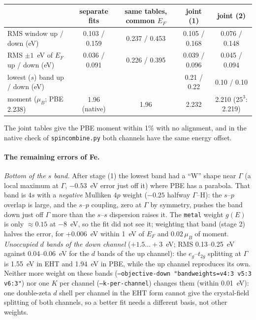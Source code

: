 \documentclass[11pt,a4paper]{article}
\newcommand{\cmd}[1]{\texttt{#1}}
\renewcommand{\_}{\origunderscore\allowbreak}
\begin{document}
\begin{center}\footnotesize\setlength{\tabcolsep}{4pt}
\begin{tabular}{l c c c c}
\toprule
 & separate fits & same tables, common $E_F$ & joint (1) & joint (2) \\
\midrule
RMS window up / down (eV) & 0.103 / 0.159 & 0.237 / 0.453 & 0.105 / 0.168 & 0.076 / 0.148 \\
RMS $\pm1$~eV of $E_F$ up / down (eV) & 0.036 / 0.091 & 0.226 / 0.395 & 0.039 / 0.096 & 0.045 / 0.094 \\
lowest ($s$) band up / down (eV) & & & 0.21 / 0.22 & 0.10 / 0.10 \\
moment ($\mu_B$; PBE 2.238) & 1.96 (native) & 1.96 & 2.232 & 2.210 ($25^3$: 2.219) \\
\bottomrule
\end{tabular}\end{center}
The joint tables give the PBE moment within 1\% with no alignment, and in the native check of \cmd{spin\_combine.py} both channels
have the same energy offset.

\paragraph{The remaining errors of Fe.} \emph{Bottom of the $s$ band.} After stage (1) the lowest band had a ``W'' shape near
$\Gamma$ (a local maximum at $\Gamma$, $-0.53$~eV error just off it) where PBE has a parabola. That band is $4s$ with a
\emph{negative} Mulliken $4p$ weight ($-0.25$ halfway $\Gamma$--H): the $s$--$p$ overlap is large, and the $s$--$p$ coupling,
zero at $\Gamma$ by symmetry, pushes the band down just off $\Gamma$ more than the $s$--$s$ dispersion raises it. The
\cmd{metal} weight $g(E)$ is only $\approx0.15$ at $-8$~eV, so the fit did not see it; weighting that band (stage 2) halves the
error, for $+0.006$~eV within 1~eV of $E_F$ and $0.02\,\mu_B$ of moment. \emph{Unoccupied $d$ bands of the down channel}
($+1.5\ldots+3$~eV; RMS 0.13--0.25~eV against 0.04--0.06~eV for the $d$ bands of the up channel): the $e_g$--$t_{2g}$ splitting
at $\Gamma$ is 1.55~eV in EHT and 1.94~eV in PBE, while the up channel reproduces its own. Neither more weight on these bands
(\cmd{--objective-down "band\_weights=v4:3 v5:3 v6:3"}) nor one $K$ per channel (\cmd{--k-per-channel}) changes them (within
0.01~eV): one double-zeta $d$ shell per channel in the EHT form cannot give the crystal-field splitting of both channels, so a
better fit needs a different basis, not other weights.
\end{document}
